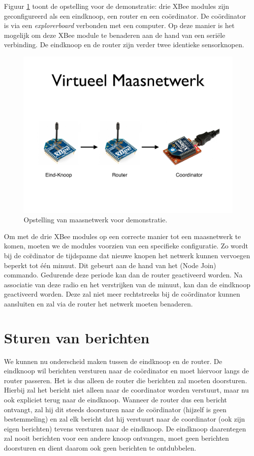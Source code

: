 Figuur \ref{fig:xbee-setup} toont de opstelling voor de demonstratie: drie XBee
modules zijn geconfigureerd als een eindknoop, een router en een
co\"ordinator. De co\"ordinator is via een \emph{explorerboard} verbonden met
een computer. Op deze manier is het mogelijk om deze XBee module te benaderen
aan de hand van een seri\"ele verbinding. De eindknoop en de router zijn
verder twee identieke sensorknopen.

\begin{figure}[ht]
  \centering
  \includegraphics[width=\linewidth]{resources/xbee-setup.pdf}
  \caption{Opstelling van maasnetwerk voor demonstratie.}
  \label{fig:xbee-setup}
\end{figure}

Om met de drie XBee modules op een correcte manier tot een maasnetwerk te
komen, moeten we de modules voorzien van een specifieke configuratie. Zo wordt
bij de co\"rdinator de tijdspanne dat nieuwe knopen het netwerk kunnen
vervoegen beperkt tot \'e\'en minuut. Dit gebeurt aan de hand van het 
(Node Join) commando. Gedurende deze periode kan dan de router geactiveerd
worden. Na associatie van deze radio en het verstrijken van de minuut, kan dan
de eindknoop geactiveerd worden. Deze zal niet meer rechtstreeks bij de
co\"ordinator kunnen aansluiten en zal via de router het netwerk moeten
benaderen.

\section{Sturen van berichten}

We kunnen nu onderscheid maken tussen de eindknoop en de router. De eindknoop
wil berichten versturen naar de co\"ordinator en moet hiervoor langs de router
passeren. Het is dus alleen de router die berichten zal moeten doorsturen.
Hierbij zal het bericht niet alleen naar de coordinator worden verstuurt, maar
nu ook expliciet terug naar de eindknoop. Wanneer de router dus een bericht
ontvangt, zal hij dit steeds doorsturen naar de co\"ordinator (hijzelf is geen
bestemmeling) en zal elk bericht dat hij verstuurt naar de coordinator (ook
zijn eigen berichten) tevens versturen naar de eindknoop. De eindknoop
daarentegen zal nooit berichten voor een andere knoop ontvangen, moet geen
berichten doorsturen en dient daarom ook geen berichten te ontdubbelen.

